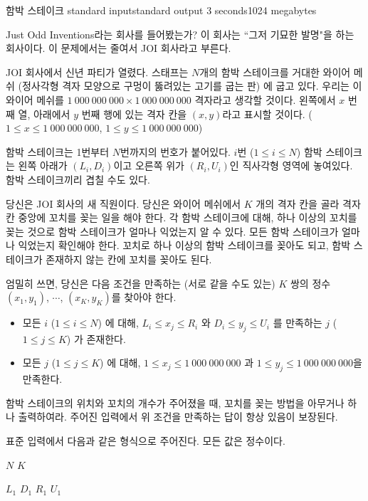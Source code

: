 \begin{problem}{함박 스테이크}
	{standard input}{standard output}
	{3 seconds}{1024 megabytes}{}
	
	Just Odd Inventions라는 회사를 들어봤는가? 이 회사는 ``그저 기묘한 발명"을 하는 회사이다. 이 문제에서는 줄여서 JOI 회사라고 부른다.
	 
	JOI 회사에서 신년 파티가 열렸다. 스태프는 $N$개의 함박 스테이크를 거대한 와이어 메쉬 (정사각형 격자 모양으로 구멍이 뚫려있는 고기를 굽는 판) 에 굽고 있다. 우리는 이 와이어 메쉬를 $1\ 000\ 000\ 000 \times 1\ 000\ 000\ 000$ 격자라고 생각할 것이다. 왼쪽에서 $x$ 번째 열, 아래에서 $y$ 번째 행에 있는 격자 칸을 $(x, y)$라고 표시할 것이다. ($1 \le x \le 1\ 000\ 000\ 000$, $1 \le y \le 1\ 000\ 000\ 000$)
	
	함박 스테이크는 1번부터 $N$번까지의 번호가 붙어있다. $i$번 ($1 \le i \le N$) 함박 스테이크는 왼쪽 아래가 $(L_i, D_i)$이고 오른쪽 위가 $(R_i, U_i)$인 직사각형 영역에 놓여있다. 함박 스테이크끼리 겹칠 수도 있다.
	
	당신은 JOI 회사의 새 직원이다. 당신은 와이어 메쉬에서 $K$ 개의 격자 칸을 골라 격자 칸 중앙에 꼬치를 꽂는 일을 해야 한다. 각 함박 스테이크에 대해, 하나 이상의 꼬치를 꽂는 것으로 함박 스테이크가 얼마나 익었는지 알 수 있다. 모든 함박 스테이크가 얼마나 익었는지 확인해야 한다. 꼬치로 하나 이상의 함박 스테이크를 꽂아도 되고, 함박 스테이크가 존재하지 않는 칸에 꼬치를 꽂아도 된다.
	
	엄밀히 쓰면, 당신은 다음 조건을 만족하는 (서로 같을 수도 있는) $K$ 쌍의 정수 $(x_1, y_1)$, $\cdots$, $(x_K, y_K)$를 찾아야 한다.
	
	\begin{itemize}
		\item 모든 $i$ ($1 \le i \le N$) 에 대해, $L_i \le x_j \le R_i$ 와 $D_i \le y_j \le U_i$ 를 만족하는 $j$ ($1 \le j \le K$) 가 존재한다.
		\item 모든 $j$ ($1 \le j \le K$) 에 대해, $1 \le x_j \le 1\ 000\ 000\ 000$ 과 $1 \le y_j \le 1\ 000\ 000\ 000$을 만족한다.
	\end{itemize}

	함박 스테이크의 위치와 꼬치의 개수가 주어졌을 때, 꼬치를 꽂는 방법을 아무거나 하나 출력하여라. 주어진 입력에서 위 조건을 만족하는 답이 항상 있음이 보장된다.

	
\InputFile

표준 입력에서 다음과 같은 형식으로 주어진다. 모든 값은 정수이다.

$N$ $K$

$L_1$ $D_1$ $R_1$ $U_1$


\end{problem}
